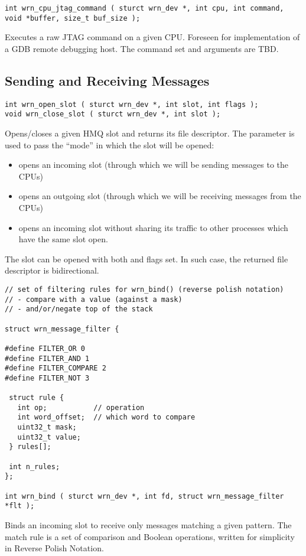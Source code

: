 \documentclass{article}
\begin{document}
\begin{verbatim}
int wrn_cpu_jtag_command ( sturct wrn_dev *, int cpu, int command, void *buffer, size_t buf_size );
\end{verbatim}
Executes a raw JTAG command on a given CPU. Foreseen for implementation of a GDB remote debugging host. The command set and arguments are TBD.

\subsection{Sending and Receiving Messages}

\begin{verbatim}
int wrn_open_slot ( sturct wrn_dev *, int slot, int flags );
void wrn_close_slot ( sturct wrn_dev *, int slot );
\end{verbatim}
Opens/closes a given HMQ slot and returns its file descriptor. The  parameter is used
to pass the ``mode'' in which the slot will be opened:
\begin{itemize}
\item {} opens an incoming slot (through which we will be sending messages to the CPUs)
\item {} opens an outgoing slot (through which we will be receiving messages from the CPUs)
\item {} opens an incoming slot without sharing its traffic to other processes which have the same slot open.
\end{itemize}
The slot can be opened with both  and  flags set. In such case, the returned file descriptor is bidirectional.

\begin{verbatim}
// set of filtering rules for wrn_bind() (reverse polish notation) 
// - compare with a value (against a mask)
// - and/or/negate top of the stack

struct wrn_message_filter {

#define FILTER_OR 0
#define FILTER_AND 1
#define FILTER_COMPARE 2
#define FILTER_NOT 3

 struct rule {
   int op;           // operation 
   int word_offset;  // which word to compare
   uint32_t mask;   
   uint32_t value;
 } rules[];

 int n_rules;
};

int wrn_bind ( sturct wrn_dev *, int fd, struct wrn_message_filter *flt );
\end{verbatim}
Binds an incoming slot to receive only messages matching a given pattern. The match rule is a set of comparison and Boolean operations, written for simplicity in Reverse Polish Notation. 
\end{document}
